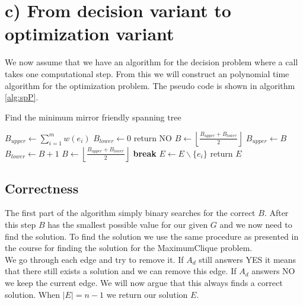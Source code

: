 \section*{c) From decision variant to optimization variant}

We now assume that we have an algorithm for the decision problem where a call takes one computational step. From this we will construct an polynomial time algorithm for the optimization problem. The pseudo code is shown in algorithm \ref{alg:spP}. 

\begin{algorithm}[ht!]
\caption{Find the minimum mirror friendly spanning tree}\label{alg:spP}
\begin{algorithmic}
\State $B_{upper} \leftarrow \sum_{i=1}^m w(e_i)$
\State $B_{lower} \leftarrow 0$
    \State return NO
\EndIf
\State $B \leftarrow \left\lfloor{\frac{B_{upper} + B_{lower}}{2}} \right\rfloor $
        \State $B_{upper} \leftarrow B$
    \Else
        \State $B_{lower} \leftarrow B+1$
    \EndIf
    \State $B \leftarrow \left\lfloor{\frac{B_{upper} + B_{lower}}{2}}\right\rfloor$
        \State \textbf{break}
    \EndIf
\EndWhile
{}
        \State $E \leftarrow E \backslash \{e_i\}$ 
    \EndIf
        \State return $E$
    \EndIf
\EndFor
\end{algorithmic}
\end{algorithm}

\subsection*{Correctness}
The first part of the algorithm simply binary searches for the correct $B$. After this step $B$ has the smallest possible value for our given $G$ and we now need to find the solution. To find the solution we use the same procedure as presented in the course for finding the solution for the MaximumClique problem.\\
We go through each edge and try to remove it. If $A_d$ still answers YES it means that there still exists a solution and we can remove this edge. If $A_d$ answers NO we keep the current edge. We will now argue that this always finds a correct solution. When $|E| = n-1$ we return our solution $E$. 
